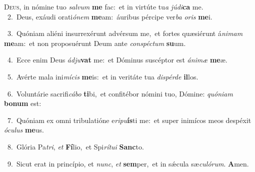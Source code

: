 \lettrine{\initial\textcolor{\initialcolor}{D}}{eus,} in nómine tuo \textit{sal}\-\textit{vum} \textbf{me} fac:~\star et in virtúte tu\textit{a} \textit{jú}\-\textit{di}\textbf{ca} me.\\
{\numbfont\textcolor{\numbcolor}{~2.}}~Deus, exáudi orati\-\textit{ó}\-\textit{nem} \textbf{me}\-am:~\star áuribus pércipe ver\textit{ba} \textit{o}\-\textit{ris} \textbf{me}\-i.\par
{\numbfont\textcolor{\numbcolor}{~3.}}~Quóniam aliéni insurrexérunt advérsum me,~\dagger et fortes quæsiérunt á\-\textit{ni}\-\textit{mam} \textbf{me}\-am:~\star et non proposuérunt Deum ante \textit{con}\-\textit{spéc}\textit{tum} \textbf{su}\-um.\par
{\numbfont\textcolor{\numbcolor}{~4.}}~Ecce enim Deus \textit{ád}\-\textit{ju}\textbf{vat} me:~\star et Dóminus suscéptor est \textit{á}\-\textit{ni}\textit{mæ} \textbf{me}\-æ.\par
{\numbfont\textcolor{\numbcolor}{~5.}}~Avérte mala ini\-\textit{mí}\-\textit{cis} \textbf{me}\-is:~\star et in veritáte tua \textit{dis}\-\textit{pér}\textit{de} \textbf{il}\-los.\par
{\numbfont\textcolor{\numbcolor}{~6.}}~Voluntárie sacrifi\-\textit{cá}\-\textit{bo} \textbf{ti}\-bi,~\star et confitébor nómini tuo, Dómine: \textit{quón}\-\textit{i}\textit{am} \textbf{bo}\-\textbf{num} est:\par
{\numbfont\textcolor{\numbcolor}{~7.}}~Quóniam ex omni tribulatióne e\-\textit{ri}\-\textit{pu}\textbf{ís}ti me:~\star et super inimícos meos despéxit \textit{ó}\-\textit{cu}\textit{lus} \textbf{me}\-us.\par
{\numbfont\textcolor{\numbcolor}{~8.}}~Glória Pa\-\textit{tri}\-, \textit{et} \textbf{Fí}\-lio,~\star et Spi\-\textit{rí}\-\textit{tu}\textit{i} \textbf{Sanc}\-to.\par
{\numbfont\textcolor{\numbcolor}{~9.}}~Sicut erat in princípio, et \textit{nunc}\-, \textit{et} \textbf{sem}\-per,~\star et in sǽcula sæ\-\textit{cu}\-\textit{ló}\textit{rum}. \textbf{A}\-men.\par
